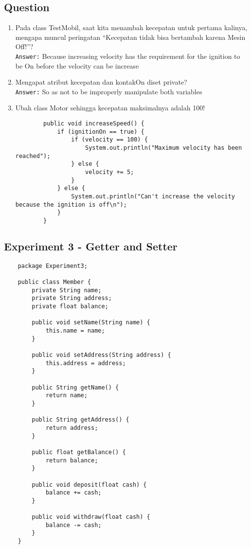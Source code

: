 \documentclass[12pt,titlepage]{article}
\begin{document}
\subsection{Question}
\begin{enumerate}
    \item Pada class TestMobil, saat kita menambah kecepatan untuk pertama kalinya, mengapa muncul peringatan “Kecepatan tidak bisa bertambah karena Mesin Off!”? \\
    \texttt{Answer:} Because increasing velocity has the requirement for the ignition to be On before the velocity can be increase
    \item Mengapat atribut kecepatan dan kontakOn diset private? \\
    \texttt{Answer:} So as not to be improperly manipulate both variables 
    \item Ubah class Motor sehingga kecepatan maksimalnya adalah 100!
    \begin{verbatim}
        public void increaseSpeed() {
            if (ignitionOn == true) {
                if (velocity == 100) {
                    System.out.println("Maximum velocity has been reached");
                } else {
                    velocity += 5;
                }
            } else {
                System.out.println("Can't increase the velocity because the ignition is off\n");
            }
        }
    \end{verbatim}
\end{enumerate}

\newpage

\subsection{Experiment 3 - Getter and Setter}

\begin{verbatim}
    package Experiment3;

    public class Member {
        private String name;
        private String address;
        private float balance;

        public void setName(String name) {
            this.name = name;
        }

        public void setAddress(String address) {
            this.address = address;
        }

        public String getName() {
            return name;
        }

        public String getAddress() {
            return address;
        }

        public float getBalance() {
            return balance;
        }

        public void deposit(float cash) {
            balance += cash;
        }

        public void withdraw(float cash) {
            balance -= cash;
        }
    }

\end{verbatim}
\end{document}
